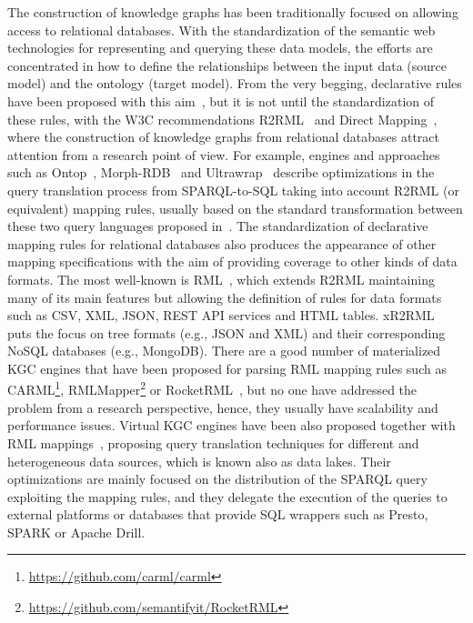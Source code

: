 The construction of knowledge graphs has been traditionally focused on allowing access to relational databases. With the standardization of the semantic web technologies for representing and querying these data models, the efforts are concentrated in how to define the relationships between the input data (source model) and the ontology (target model). From the very begging, declarative rules have been proposed with this aim~\citep{barrasa2004r2o}, but it is not until the standardization of these rules, with the W3C recommendations R2RML~\citep{R2RML} and Direct Mapping~\citep{arenas2013direct}, where the construction of knowledge graphs from relational databases attract attention from a research point of view. For example, engines and approaches such as Ontop~\citep{calvanese2017ontop}, Morph-RDB~\citep{priyatna2014formalisation} and Ultrawrap~\citep{sequeda2013ultrawrap} describe optimizations in the query translation process from SPARQL-to-SQL taking into account R2RML (or equivalent) mapping rules, usually based on the standard transformation between these two query languages proposed in~\citep{chebotko2009semantics}. The standardization of declarative mapping rules for relational databases also produces the appearance of other mapping specifications with the aim of providing coverage to other kinds of data formats. The most well-known is RML~\citep{dimou2014rml}, which extends R2RML maintaining many of its main features but allowing the definition of rules for data formats such as CSV, XML, JSON, REST API services and HTML tables. xR2RML~\citep{michel2015translation} puts the focus on tree formats (e.g., JSON and XML) and their corresponding NoSQL databases (e.g., MongoDB). There are a good number of materialized KGC engines that have been proposed for parsing RML mapping rules such as CARML\footnote{\url{https://github.com/carml/carml}}, RMLMapper\footnote{\url{https://github.com/semantifyit/RocketRML}} or RocketRML~\citep{csimcsek2019rocketrml}, but no one have addressed the problem from a research perspective, hence, they usually have scalability and performance issues. Virtual KGC engines have been also proposed together with RML mappings~\citep{endris2019ontario,mami2019squerall}, proposing query translation techniques for different and heterogeneous data sources, which is known also as data lakes. Their optimizations are mainly focused on the distribution of the SPARQL query exploiting the mapping rules, and they delegate the execution of the queries to external platforms or databases that provide SQL wrappers such as Presto, SPARK or Apache Drill.



